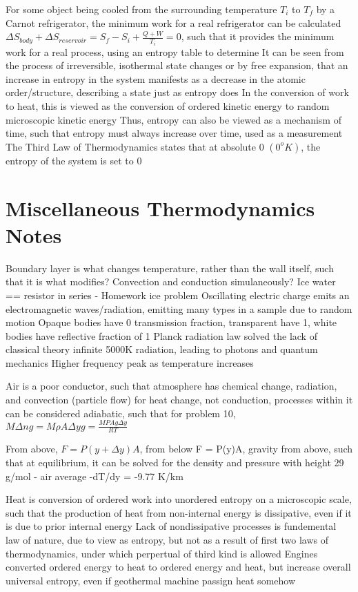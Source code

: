 \begin{outline*}
\2 For some object being cooled from the surrounding temperature $T_i$ to $T_f$ by a Carnot refrigerator, the minimum work for a real refrigerator can be calculated
\3 $\Delta S_{body} + \Delta S_{reservoir} = S_f - S_i + \frac{Q + W}{T_i} = 0$, such that it provides the minimum work for a real process, using an entropy table to determine
\1 It can be seen from the process of irreversible, isothermal state changes or by free expansion, that an increase in entropy in the system manifests as a decrease in the atomic order/structure, describing a state just as entropy does
\2 In the conversion of work to heat, this is viewed as the conversion of ordered kinetic energy to random microscopic kinetic energy
\2 Thus, entropy can also be viewed as a mechanism of time, such that entropy must always increase over time, used as a measurement
\1 The Third Law of Thermodynamics states that at absolute 0 $(0^o K)$, the entropy of the system is set to 0
\end{outline*}
\section{Miscellaneous Thermodynamics Notes}
Boundary layer is what changes temperature, rather than the wall itself, such that it is what modifies? Convection and conduction simulaneously? Ice water == resistor in series - Homework ice problem
Oscillating electric charge emits an electromagnetic waves/radiation, emitting many types in a sample due to random motion
Opaque bodies have 0 transmission fraction, transparent have 1, white bodies have reflective fraction of 1
Planck radiation law solved the lack of classical theory infinite 5000K radiation, leading to photons and quantum mechanics
Higher frequency peak as temperature increases

Air is a poor conductor, such that atmosphere has chemical change, radiation, and convection (particle flow) for heat change, not conduction, processes within it can be considered adiabatic, such that for problem 10, $M\Delta ng = M\rho A\Delta yg = \frac{MPAg\Delta y}{RT}$

From above, $F = P(y + \Delta y)A$, from below F = P(y)A, gravity from above, such that at equilibrium, it can be solved for the density and pressure with height
29 g/mol - air average
-dT/dy = -9.77 K/km

Heat is conversion of ordered work into unordered entropy on a microscopic scale, such that the production of heat from non-internal energy is dissipative, even if it is due to prior internal energy
Lack of nondissipative processes is fundemental law of nature, due to view as entropy, but not as a result of first two laws of thermodynamics, under which perpertual of third kind is allowed
Engines converted ordered energy to heat to ordered energy and heat, but increase overall universal entropy, even if geothermal machine passign heat somehow

